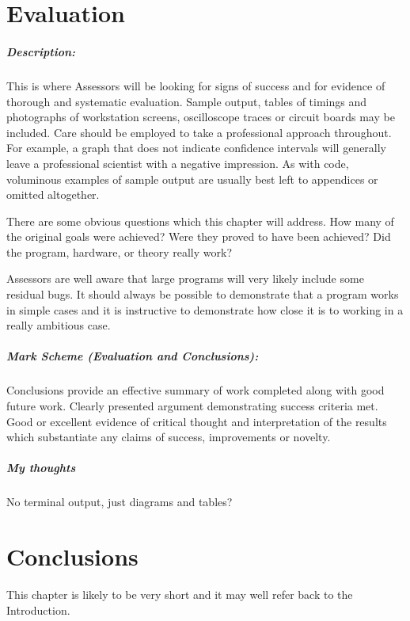 \documentclass[12pt,a4paper,twoside,openright]{report}
\begin{document}
\chapter{Evaluation}

\paragraph{Description:}
This is where Assessors will be looking for signs of success and for evidence of thorough and systematic evaluation.
Sample output, tables of timings and photographs of workstation screens, oscilloscope traces or circuit boards may be included.
Care should be employed to take a professional approach throughout.
For example, a graph that does not indicate confidence intervals will generally leave a professional scientist with a negative impression. 
As with code, voluminous examples of sample output are usually best left to appendices or omitted altogether.
\par
There are some obvious questions which this chapter will address. How many of the original goals were achieved? Were they proved to have been achieved? Did the program, hardware, or theory really work?
\par
Assessors are well aware that large programs will very likely include some residual bugs. It should always be possible to demonstrate that a program works in simple cases and it is instructive to demonstrate how close it is to working in a really ambitious case.

\paragraph{Mark Scheme (Evaluation and Conclusions): }
Conclusions provide an effective summary of work completed along with good future work.
Clearly presented argument demonstrating success criteria met.
Good or excellent evidence of critical thought and interpretation of the results which substantiate any claims of success, improvements or novelty.

\paragraph{My thoughts}
No terminal output, just diagrams and tables?


\chapter{Conclusions}
This chapter is likely to be very short and it may well refer back to the Introduction. 
\end{document}
